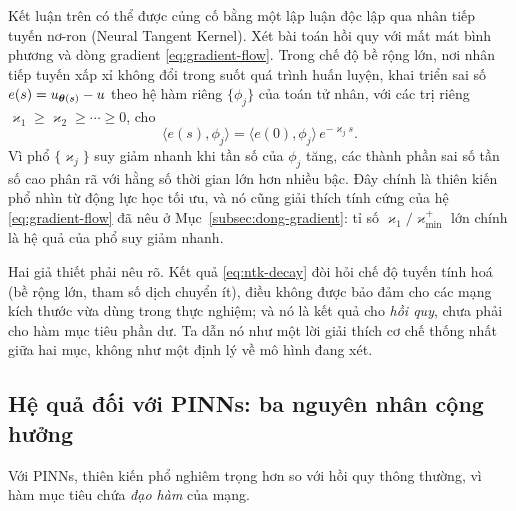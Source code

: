 \begin{nhanxet}
\label{rem:ntk-view}
Kết luận trên có thể được củng cố bằng một lập luận độc lập qua nhân tiếp tuyến
nơ-ron (Neural Tangent Kernel). Xét bài toán hồi quy với mất mát bình phương và
dòng gradient \eqref{eq:gradient-flow}. Trong chế độ bề rộng lớn, nơi nhân tiếp
tuyến xấp xỉ không đổi trong suốt quá trình huấn luyện, khai triển sai số
$e(s) = u_{\bm{\theta}(s)} - u$ theo hệ hàm riêng $\{\phi_{j}\}$ của toán tử nhân,
với các trị riêng $\varkappa_{1} \ge \varkappa_{2} \ge \cdots \ge 0$, cho
\begin{equation}
\langle e(s), \phi_{j} \rangle
= \langle e(0), \phi_{j} \rangle\, e^{-\varkappa_{j} s}.
\label{eq:ntk-decay}
\end{equation}
Vì phổ $\{\varkappa_{j}\}$ suy giảm nhanh khi tần số của $\phi_{j}$ tăng, các
thành phần sai số tần số cao phân rã với hằng số thời gian lớn hơn nhiều bậc. Đây
chính là thiên kiến phổ nhìn từ động lực học tối ưu, và nó cũng giải thích tính
cứng của hệ \eqref{eq:gradient-flow} đã nêu ở Mục~\ref{subsec:dong-gradient}: tỉ
số $\varkappa_1/\varkappa_{\min}^{+}$ lớn chính là hệ quả của phổ suy giảm nhanh.
 
Hai giả thiết phải nêu rõ. Kết quả \eqref{eq:ntk-decay} đòi hỏi chế độ tuyến tính
hoá (bề rộng lớn, tham số dịch chuyển ít), điều không được bảo đảm cho các mạng
kích thước vừa dùng trong thực nghiệm; và nó là kết quả cho \emph{hồi quy}, chưa
phải cho hàm mục tiêu phần dư. Ta dẫn nó như một lời giải thích cơ chế thống nhất
giữa hai mục, không như một định lý về mô hình đang xét.
\end{nhanxet}
 
\subsection{Hệ quả đối với PINNs: ba nguyên nhân cộng hưởng}
\label{subsec:he-qua-pinn}
 
Với PINNs, thiên kiến phổ nghiêm trọng hơn so với hồi quy thông thường, vì hàm
mục tiêu chứa \emph{đạo hàm} của mạng.
 
